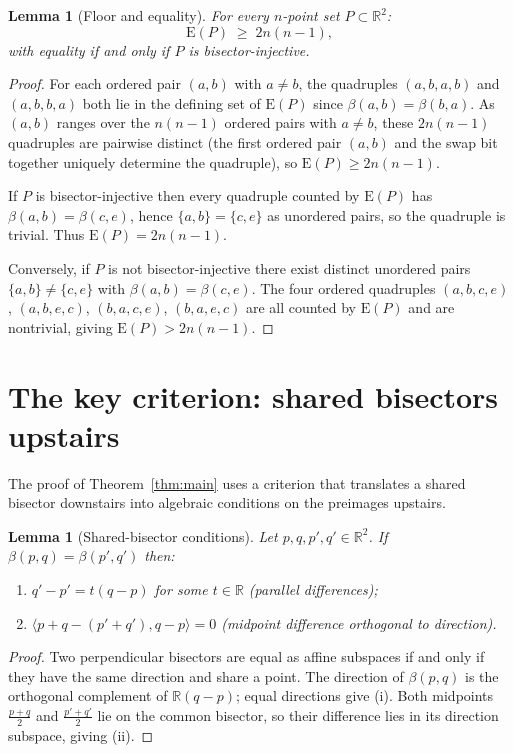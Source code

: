 \documentclass[12pt]{article}
\newtheorem{lemma}[theorem]{Lemma}
\newcommand{\R}{\mathbb{R}}
\newcommand{\E}{\mathrm{E}}         %
\newcommand{\bis}[2]{\beta(#1,#2)}  %
\newcommand{\ip}[2]{\langle #1,#2\rangle}
\begin{document}
\begin{lemma}[Floor and equality]
\label{lem:floor}
For every $n$-point set $P\subset\R^2$:
\[
  \E(P) \;\ge\; 2n(n-1),
\]
with equality if and only if $P$ is bisector-injective.
\end{lemma}

\begin{proof}
For each ordered pair $(a,b)$ with $a\ne b$, the quadruples $(a,b,a,b)$ and
$(a,b,b,a)$ both lie in the defining set of $\E(P)$ since $\bis{a}{b}=\bis{b}{a}$.
As $(a,b)$ ranges over the $n(n-1)$ ordered pairs with $a\ne b$, these $2n(n-1)$
quadruples are pairwise distinct (the first ordered pair $(a,b)$ and the swap bit
together uniquely determine the quadruple), so $\E(P)\ge 2n(n-1)$.

If $P$ is bisector-injective then every quadruple counted by $\E(P)$ has
$\bis{a}{b}=\bis{c}{e}$, hence $\{a,b\}=\{c,e\}$ as unordered pairs,
so the quadruple is trivial.  Thus $\E(P)=2n(n-1)$.

Conversely, if $P$ is not bisector-injective there exist distinct unordered
pairs $\{a,b\}\ne\{c,e\}$ with $\bis{a}{b}=\bis{c}{e}$.
The four ordered quadruples $(a,b,c,e)$, $(a,b,e,c)$, $(b,a,c,e)$, $(b,a,e,c)$
are all counted by $\E(P)$ and are nontrivial, giving $\E(P)>2n(n-1)$.
\end{proof}

\section{The key criterion: shared bisectors upstairs}

The proof of Theorem~\ref{thm:main} uses a criterion that translates a shared
bisector downstairs into algebraic conditions on the preimages upstairs.

\begin{lemma}[Shared-bisector conditions]
\label{lem:shared-bis}
Let $p,q,p',q'\in\R^2$.  If $\bis{p}{q}=\bis{p'}{q'}$ then:
\begin{enumerate}
  \item[\rm(i)] $q'-p'=t(q-p)$ for some $t\in\R$ \emph{(parallel differences)};
  \item[\rm(ii)] $\ip{p+q-(p'+q')}{q-p}=0$
        \emph{(midpoint difference orthogonal to direction)}.
\end{enumerate}
\end{lemma}

\begin{proof}
Two perpendicular bisectors are equal as affine subspaces if and only if they
have the same direction and share a point.
The direction of $\bis{p}{q}$ is the orthogonal complement of $\R(q-p)$;
equal directions give (i).
Both midpoints $\frac{p+q}{2}$ and $\frac{p'+q'}{2}$ lie on the common bisector,
so their difference lies in its direction subspace, giving (ii).
\end{proof}
\end{document}
